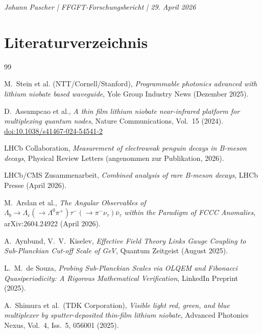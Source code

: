 	\vspace{2cm}
	\begin{center}
		\small \textit{Johann Pascher | FFGFT-Forschungsbericht | 29. April 2026}
	\end{center}
	
	\newpage
	\section*{Literaturverzeichnis}
	
	\begin{thebibliography}{99}
		
		M.~Stein et al. (NTT/Cornell/Stanford), 
		\textit{Programmable photonics advanced with lithium niobate based waveguide},
		Yole Group Industry News (Dezember 2025).
		
		D.~Assumpcao et al., 
		\textit{A thin film lithium niobate near-infrared platform for multiplexing quantum nodes},
		Nature Communications, Vol.~15 (2024).
		\href{https://doi.org/10.1038/s41467-024-54541-2}{doi:10.1038/s41467-024-54541-2}
		
		LHCb Collaboration, 
		\textit{Measurement of electroweak penguin decays in B-meson decays},
		Physical Review Letters (angenommen zur Publikation, 2026).
		
		LHCb/CMS Zusammenarbeit,
		\textit{Combined analysis of rare B-meson decays},
		LHCb Presse (April 2026).
		
		M.~Arslan et al., 
		\textit{The Angular Observables of $\Lambda_b \to \Lambda_c(\to \Lambda^0 \pi^+) \tau^-(\to \pi^- \nu_\tau) \bar{\nu}_\tau$ within the Paradigm of FCCC Anomalies},
		arXiv:2604.24922 (April 2026).
		
		A.~Aynbund, V.~V.~Kiselev, 
		\textit{Effective Field Theory Links Gauge Coupling to Sub-Planckian Cut-off Scale of GeV},
		Quantum Zeitgeist (August 2025).
		
		L.~M.~de Souza, 
		\textit{Probing Sub-Planckian Scales via OLQEM and Fibonacci Quasiperiodicity: A Rigorous Mathematical Verification},
		LinkedIn Preprint (2025).
		
		A.~Shimura et al.\ (TDK Corporation), 
		\textit{Visible light red, green, and blue multiplexer by sputter-deposited thin-film lithium niobate},
		Advanced Photonics Nexus, Vol.~4, Iss.~5, 056001 (2025).
		
	\end{thebibliography}
	
